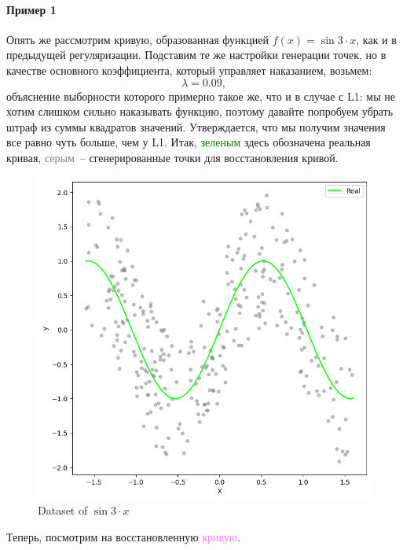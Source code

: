 \documentclass[12pt, a4paper, oneside, final]{article}
\begin{document}
	\paragraph{Пример 1}
	Опять же рассмотрим кривую, образованная функцией $f(x) = \sin{3 \cdot x}$, как и в предыдущей регуляризации.
	Подставим те же настройки генерации точек, но в качестве основного коэффициента, который управляет наказанием, возьмем:
	\[
		\lambda = 0.09,
	\] объяснение выборности которого примерно такое же, что и в случае с L1: мы не хотим слишком сильно наказывать функцию, поэтому давайте попробуем убрать штраф из суммы квадратов значений.
	Утверждается, что мы получим значения все равно чуть больше, чем у L1.
	Итак, \textcolor{green}{зеленым} здесь обозначена реальная кривая, \textcolor{gray}{серым}~-- сгенерированные точки для восстановления кривой.
	\begin{figure}[H]
		\centering
		\includegraphics[scale = 0.8]{Image/AT2_L2_DATA.png}
		\caption*{Dataset of $\sin{3 \cdot x}$}
	\end{figure}
	Теперь, посмотрим на восстановленную \textcolor{violet}{кривую}.
\end{document}
